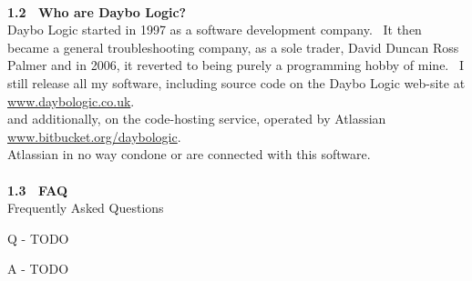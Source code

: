 \documentclass{article}
\begin{document}
\\
\textbf{1.2~ Who are Daybo Logic?}
\\
Daybo Logic started in 1997 as a software development company.~ It
then became a general troubleshooting company, as a sole trader, David
Duncan Ross Palmer and in 2006, it reverted to being purely a
programming hobby of mine.~ I still release all my software,
including source code on the Daybo Logic web-site at \href{http://www.daybologic.co.uk/}{www.daybologic.co.uk}.\\
and additionally, on the code-hosting service, operated by Atlassian
\href{https://bitbucket.org/daybologic}{www.bitbucket.org/daybologic}.\\
Atlassian in no way condone or are connected with this software.\\
\\
\textbf{1.3~ FAQ}
\\
Frequently Asked Questions
\\
\par Q - TODO

A - TODO
\end{document}
